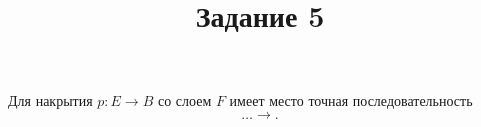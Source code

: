 \documentclass[a4paper]{article}
\title{Задание 5}
\begin{document}
	\maketitle
Для накрытия $p\colon E\to B$ со слоем $F$ имеет место точная
последовательность
\[
\ldots \to 
.\] 
\end{document}
